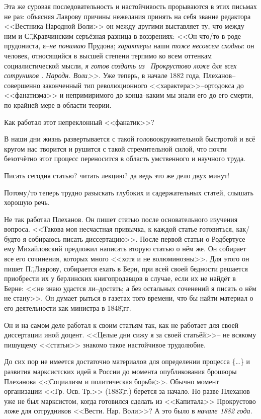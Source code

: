 Эта же суровая последовательность и настойчивость прорываются в этих письмах не раз: объясняя Лаврову причины нежелания принять на себя звание редактора <<Вестника Народной Воли>> он между другими выставляет ту, что между ним и С.\=,Кравчинским серъёзная разница в воззрениях: <<Он что\-/то в роде прудониста, я\---\emph{не понимаю} Прудона; \emph{характеры} наши \emph{тоже несовсем сходны}: он человек, относящийся в высшей степени терпимо ко всем оттенкам социалистической мысли, \emph{я готов создать из \grqq\ Прокрустово ложе для всех сотруников . Народн. Воли\grqq>>.} Уже теперь, в начале 1882 года, Плеханов\---совершенно законченный тип революционного <<характера>>\---ортодокса до <<фанатизма>> и непримиримого до конца\---каким мы знали его до его смерти, по крайней мере в области теории.

Как работал этот непреклонный <<фанатик>>?

В наши дни жизнь развертывается с такой головоокружительной быстротой и всё кругом нас творится и рушится с такой стремительной силой, что почти безотчётно этот процесс переносится в область умственного и научного труда.

Писать сегодня статью? читать лекцию? да ведь это же дело двух минут!

Потому\-/то теперь трудно разыскать глубоких и садержательных статей, слышать хорошую речь.

Не так работал Плеханов. Он пишет статью после основательного изучения вопроса. <<Такова моя несчастная привычка, к каждой статье готовиться, как\-/будто я собираюсь писать диссертацию>>. После первой статьи о Родбертусе ему Михайловский предложил написать вторую статью о нём же. Он собирает все его сочинения, которых много <<хотя и не волюминозны>>. Для этого он пишет П.\=,Лаврову, собирается ехать в Берн, при всей своей бедности решается приобрести их у берлинских книгопродавцов в случае, если их не найдёт в Берне: <<не знаю удастся ли\---достать; а без остальных соченений я писать о нём не стану>>. Он думает рыться в газетах того времени, что бы найти материал о его деятельности как министра в 1848\=,гг.

Он и на самом деле работал к своим статьям так, как не работает для своей диссертации иной доцент. <<Целые дни сижу я за своей статьёй>>\--- не всякому пишущему <<статьи>> знакомо такое настойчивое трудолюбие.

До сих пор не имеется достаточно материалов для определении процесса \{\dots \} и развития марксистских идей в России до момента опубликования брошюры Плеханова <<Социализм и политическая борьба>>. Обычно момент организации <<Гр. Осв. Тр.>> (1883\=,г.) берется за начало. Но разве Плеханов уже не был марксистом, когда готовился сделать из <<Капитала>> Прокрустово ложе для сотрудников <<Вести. Нар. Воли>>? А это было в \emph{начале 1882 года.}

